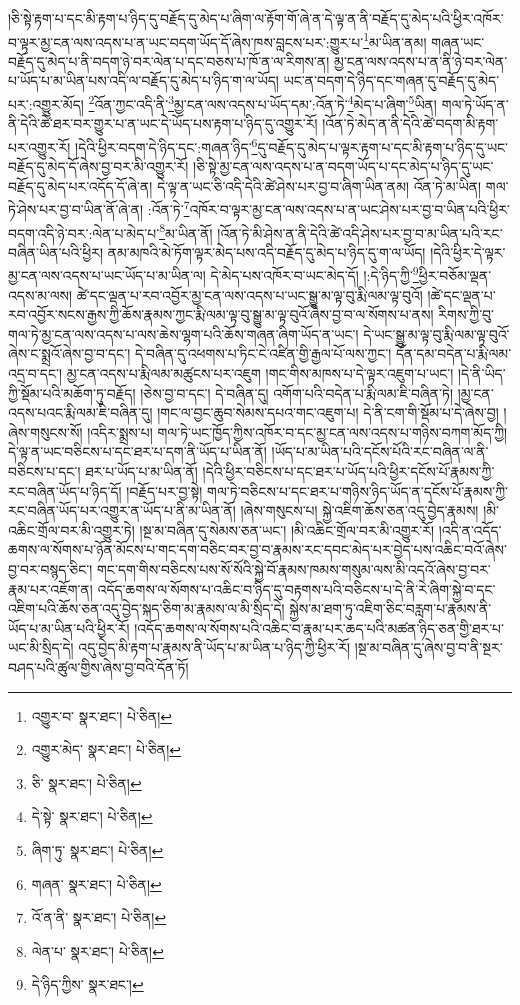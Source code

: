།ཅི་སྟེ་རྟག་པ་དང་མི་རྟག་པ་ཉིད་དུ་བརྗོད་དུ་མེད་པ་ཞིག་ལ་རྟོག་གོ་ཞེ་ན་དེ་ལྟ་ན་ནི་བརྗོད་དུ་མེད་པའི་ཕྱིར་འཁོར་བ་ལྟར་མྱ་ངན་ལས་འདས་པ་ན་ཡང་བདག་ཡོད་དོ་ཞེས་ཁས་བླངས་པར་:གྱུར་པ་\footnote{འགྱུར་བ་  སྣར་ཐང་།  པེ་ཅིན། }མ་ཡིན་ནམ། གཞན་ཡང་བརྗོད་དུ་མེད་པ་ནི་བདག་ཉེ་བར་ལེན་པ་དང་བཅས་པ་ཁོ་ན་ལ་རིགས་ན། མྱ་ངན་ལས་འདས་པ་ན་ནི་ཉེ་བར་ལེན་པ་ཡོད་པ་མ་ཡིན་པས་འདི་ལ་བརྗོད་དུ་མེད་པ་ཉིད་ག་ལ་ཡོད། ཡང་ན་བདག་དེ་ཉིད་དང་གཞན་དུ་བརྗོད་དུ་མེད་པར་:འགྱུར་མོད། \footnote{འགྱུར་མེད་  སྣར་ཐང་།  པེ་ཅིན། }འོན་ཀྱང་འདི་ནི་\footnote{ཅི་  སྣར་ཐང་།  པེ་ཅིན། }མྱ་ངན་ལས་འདས་པ་ཡོད་དམ་:འོན་ཏེ་\footnote{དེ་སྟེ་  སྣར་ཐང་།  པེ་ཅིན། }མེད་པ་ཞིག་\footnote{ཞིག་ཏུ་  སྣར་ཐང་།  པེ་ཅིན། }ཡིན། གལ་ཏེ་ཡོད་ན་ནི་དེའི་ཚེ་ཐར་བར་གྱུར་པ་ན་ཡང་དེ་ཡོད་པས་རྟག་པ་ཉིད་དུ་འགྱུར་རོ། །འོན་ཏེ་མེད་ན་ནི་དེའི་ཚེ་བདག་མི་རྟག་པར་འགྱུར་རོ། །དེའི་ཕྱིར་བདག་དེ་ཉིད་དང་:གཞན་ཉིད་\footnote{གཞན་  སྣར་ཐང་།  པེ་ཅིན། }དུ་བརྗོད་དུ་མེད་པ་ལྟར་རྟག་པ་དང་མི་རྟག་པ་ཉིད་དུ་ཡང་བརྗོད་དུ་མེད་དོ་ཞེས་བྱ་བར་མི་འགྱུར་རོ། །ཅི་སྟེ་མྱ་ངན་ལས་འདས་པ་ན་བདག་ཡོད་པ་དང་མེད་པ་ཉིད་དུ་ཡང་བརྗོད་དུ་མེད་པར་འདོད་དོ་ཞེ་ན། དེ་ལྟ་ན་ཡང་ཅི་འདི་དེའི་ཚེ་ཤེས་པར་བྱ་བ་ཞིག་ཡིན་ནམ། འོན་ཏེ་མ་ཡིན། གལ་ཏེ་ཤེས་པར་བྱ་བ་ཡིན་ནོ་ཞེ་ན། :འོན་ཏེ་\footnote{འོ་ན་ནི་  སྣར་ཐང་།  པེ་ཅིན། }འཁོར་བ་ལྟར་མྱ་ངན་ལས་འདས་པ་ན་ཡང་ཤེས་པར་བྱ་བ་ཡིན་པའི་ཕྱིར་བདག་འདི་ཉེ་བར་:ལེན་པ་མེད་པ་\footnote{ལེན་པ་  སྣར་ཐང་།  པེ་ཅིན། }མ་ཡིན་ནོ། །འོན་ཏེ་མི་ཤེས་ན་ནི་དེའི་ཚེ་འདི་ཤེས་པར་བྱ་བ་མ་ཡིན་པའི་རང་བཞིན་ཡིན་པའི་ཕྱིར། ནམ་མཁའི་མེ་ཏོག་ལྟར་མེད་པས་འདི་བརྗོད་དུ་མེད་པ་ཉིད་དུ་ག་ལ་ཡོད། །དེའི་ཕྱིར་དེ་ལྟར་མྱ་ངན་ལས་འདས་པ་ཡང་ཡོད་པ་མ་ཡིན་ལ། དེ་མེད་པས་འཁོར་བ་ཡང་མེད་དོ། །:དེ་ཉིད་ཀྱི་\footnote{དེ་ཉིད་ཀྱིས་  སྣར་ཐང་། }ཕྱིར་བཅོམ་ལྡན་འདས་མ་ལས། ཚེ་དང་ལྡན་པ་རབ་འབྱོར་མྱ་ངན་ལས་འདས་པ་ཡང་སྒྱུ་མ་ལྟ་བུ་རྨི་ལམ་ལྟ་བུའོ། །ཚེ་དང་ལྡན་པ་རབ་འབྱོར་སངས་རྒྱས་ཀྱི་ཆོས་རྣམས་ཀྱང་རྨི་ལམ་ལྟ་བུ་སྒྱུ་མ་ལྟ་བུའོ་ཞེས་བྱ་བ་ལ་སོགས་པ་ནས། རིགས་ཀྱི་བུ་གལ་ཏེ་མྱ་ངན་ལས་འདས་པ་ལས་ཆེས་ལྷག་པའི་ཆོས་གཞན་ཞིག་ཡོད་ན་ཡང་། དེ་ཡང་སྒྱུ་མ་ལྟ་བུ་རྨི་ལམ་ལྟ་བུའོ་ཞེས་ང་སྨྲའོ་ཞེས་བྱ་བ་དང་། དེ་བཞིན་དུ་འཕགས་པ་ཏིང་ངེ་འཛིན་གྱི་རྒྱལ་པོ་ལས་ཀྱང་། དོན་དམ་བདེན་པ་རྨི་ལམ་འདྲ་བ་དང་། མྱ་ངན་འདས་པ་རྨི་ལམ་མཚུངས་པར་འཇུག །གང་གིས་མཁས་པ་དེ་ལྟར་འཇུག་པ་ཡང་། །དེ་ནི་ཡིད་ཀྱི་སྡོམ་པའི་མཆོག་ཏུ་བརྗོད། །ཅེས་བྱ་བ་དང་། དེ་བཞིན་དུ། འགོག་པའི་བདེན་པ་རྨི་ལམ་ཇི་བཞིན་ཏེ། །མྱ་ངན་འདས་པའང་རྨི་ལམ་ཇི་བཞིན་དུ། །གང་ལ་བྱང་ཆུབ་སེམས་དཔའ་གང་འཇུག་པ། དེ་ནི་ངག་གི་སྡོམ་པ་དེ་ཞེས་བྱ། །ཞེས་གསུངས་སོ། །འདིར་སྨྲས་པ། གལ་ཏེ་ཡང་ཁྱོད་ཀྱིས་འཁོར་བ་དང་མྱ་ངན་ལས་འདས་པ་གཉིས་བཀག་མོད་ཀྱི། དེ་ལྟ་ན་ཡང་བཅིངས་པ་དང་ཐར་པ་དག་ནི་ཡོད་པ་ཡིན་ནོ། །ཡོད་པ་མ་ཡིན་པའི་དངོས་པོའི་རང་བཞིན་ལ་ནི་བཅིངས་པ་དང་། ཐར་པ་ཡོད་པ་མ་ཡིན་ནོ། །དེའི་ཕྱིར་བཅིངས་པ་དང་ཐར་པ་ཡོད་པའི་ཕྱིར་དངོས་པོ་རྣམས་ཀྱི་རང་བཞིན་ཡོད་པ་ཉིད་དོ། །བརྗོད་པར་བྱ་སྟེ། གལ་ཏེ་བཅིངས་པ་དང་ཐར་པ་གཉིས་ཉིད་ཡོད་ན་དངོས་པོ་རྣམས་ཀྱི་རང་བཞིན་ཡོད་པར་འགྱུར་ན་ཡོད་པ་ནི་མ་ཡིན་ནོ། །ཞེས་གསུངས་པ། སྐྱེ་འཇིག་ཆོས་ཅན་འདུ་བྱེད་རྣམས། །མི་འཆིང་གྲོལ་བར་མི་འགྱུར་ཏེ། །སྔ་མ་བཞིན་དུ་སེམས་ཅན་ཡང་། །མི་འཆིང་གྲོལ་བར་མི་འགྱུར་རོ། །འདི་ན་འདོད་ཆགས་ལ་སོགས་པ་ཉོན་མོངས་པ་གང་དག་བཅིང་བར་བྱ་བ་རྣམས་རང་དབང་མེད་པར་བྱེད་པས་འཆིང་བའོ་ཞེས་བྱ་བར་བསྙད་ཅིང་། གང་དག་གིས་བཅིངས་པས་སོ་སོའི་སྐྱེ་བོ་རྣམས་ཁམས་གསུམ་ལས་མི་འདའོ་ཞེས་བྱ་བར་རྣམ་པར་འཇོག་ན། འདོད་ཆགས་ལ་སོགས་པ་འཆིང་བ་ཉིད་དུ་བརྟགས་པའི་བཅིངས་པ་དེ་ནི་རེ་ཞིག་སྐྱེ་བ་དང་འཇིག་པའི་ཆོས་ཅན་འདུ་བྱེད་སྐད་ཅིག་མ་རྣམས་ལ་མི་སྲིད་དེ། སྐྱེས་མ་ཐག་ཏུ་འཇིག་ཅིང་བརླག་པ་རྣམས་ནི་ཡོད་པ་མ་ཡིན་པའི་ཕྱིར་རོ། །འདོད་ཆགས་ལ་སོགས་པའི་འཆིང་བ་རྣམ་པར་ཆད་པའི་མཚན་ཉིད་ཅན་གྱི་ཐར་པ་ཡང་མི་སྲིད་དེ། འདུ་བྱེད་མི་རྟག་པ་རྣམས་ནི་ཡོད་པ་མ་ཡིན་པ་ཉིད་ཀྱི་ཕྱིར་རོ། །སྔ་མ་བཞིན་དུ་ཞེས་བྱ་བ་ནི་སྔར་བཤད་པའི་ཚུལ་གྱིས་ཞེས་བྱ་བའི་དོན་ཏོ། 